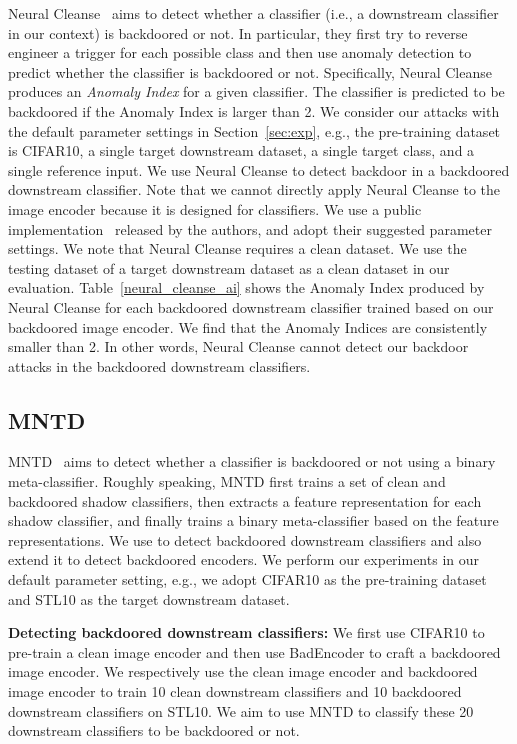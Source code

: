 Neural Cleanse~\cite{wang2019neural} aims to detect whether a classifier (i.e., a downstream classifier in our context) is backdoored or not. In particular, they first try to reverse engineer a trigger for each possible class  and then use anomaly detection to predict whether the classifier is backdoored or not. 
Specifically,  Neural Cleanse produces an \emph{Anomaly Index} for  a given classifier. The classifier is predicted to be backdoored if the Anomaly Index is larger than 2. We consider our attacks with the default parameter settings in Section~\ref{sec:exp}, e.g., the pre-training dataset is CIFAR10, a single target downstream dataset, a single target class, and a single reference input. 
We use Neural Cleanse to detect backdoor in a backdoored downstream classifier. Note that we cannot directly apply Neural Cleanse to the  image encoder because  it is designed for classifiers. We use a public implementation~\cite{neural_cleanse} released by the authors, and adopt their suggested parameter settings. We note that  Neural Cleanse requires a clean dataset. We use the testing dataset of a target downstream dataset as a clean dataset in our evaluation. Table~\ref{neural_cleanse_ai} shows the Anomaly Index produced by Neural Cleanse for each backdoored downstream classifier trained based on our backdoored image encoder. We find that the Anomaly Indices are consistently smaller than 2. In other words, Neural Cleanse cannot detect our backdoor attacks in the backdoored downstream classifiers. 








\subsection{MNTD}
MNTD~\cite{xu2019detecting} aims to detect whether a classifier is backdoored or not using a binary meta-classifier. Roughly speaking, MNTD first trains a set of clean and backdoored shadow classifiers, then extracts a feature representation for each shadow classifier, and finally trains a binary meta-classifier based on the feature representations. We use  to detect backdoored downstream classifiers and also extend it to detect backdoored encoders. We perform our experiments in our default parameter setting, e.g., we adopt CIFAR10 as the pre-training dataset and STL10 as the target downstream dataset. 




\noindent
{\bf Detecting backdoored downstream classifiers:} We first use CIFAR10 to pre-train a clean image encoder and then use BadEncoder to craft a backdoored image encoder. We respectively use the clean image encoder and backdoored image encoder to train 10 clean downstream classifiers and 10 backdoored downstream classifiers on STL10. We aim to use MNTD to classify these 20 downstream classifiers to be backdoored or not. 

